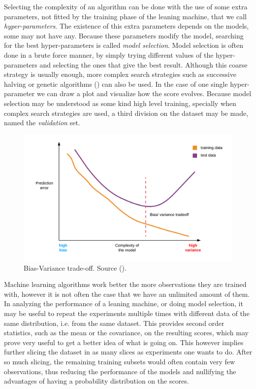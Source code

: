 Selecting the complexity of an algorithm can be done with the use of some extra parameters, not fitted by the training phase of the leaning machine, that we call \emph{hyper-parameters}. The existence of this extra parameters depends on the models, some may not have any. Because these parameters modify the model, searching for the best hyper-parameters is called \emph{model selection}. Model selection is often done in a brute force manner, by simply trying different values of the hyper-parameters and selecting the ones that give the best result. Al\-though this coarse strategy is usually enough, more complex search strategies such as successive halving or genetic algo\-rithms (\cite{claesen_hyperparameter_2015}) can also be used. In the case of one single hyper-parameter we can draw a plot and visualize how the score evolves. Because model selection may be understood as some kind high level training, specially when com\-plex search strategies are used, a third division on the dataset may be made, named the \emph{validation} set.

\begin{figure}[H]
    \centering
    \includegraphics[width=0.5\linewidth]{img/ch4/bias-and-variance.png}
    \caption{Bias-Variance trade-off. Source (\cite{bisong_machine_2021}).}
    \label{fig:ch4.biasvariance}
\end{figure}

Machine learning algorithms work better the more observations they are trained with, however it is not often the case that we have an unlimited amount of them. In analyzing the performance of a leaning machine, or doing model selection, it may be useful to repeat the experiments multiple times with different data of the same distribution, i.e. from the same dataset. This provides second order statistics, such as the mean or the covariance, on the resulting scores, which may prove very useful to get a better idea of what is going on. This however implies further slicing the dataset in as many slices as experiments one wants to do. After so much slicing, the remaining training subsets would often contain very few observations, thus reducing the performance of the models and nullifying the advantages of having a probability distribution on the scores. 

